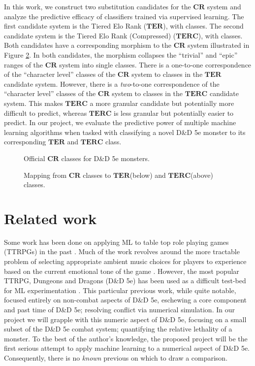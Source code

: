 \documentclass{article}
\newcommand{\Qty}[1]{\oldstylenums{#1}}
\newcommand{\CR}{\ensuremath{\mathbf{CR}}\xspace}
\newcommand{\TER}{\ensuremath{\mathbf{TER}}\xspace}
\newcommand{\TERC}{\ensuremath{\mathbf{TERC}}\xspace}
\newcommand{\DnD}{D\&D 5e\xspace}
\begin{document}
In this work, we construct two substitution candidates for the \CR system and analyze the predictive efficacy of classifiers trained via supervised learning.
The first candidate system is the Tiered Elo Rank (\TER), with \Qty{22} classes.
The second candidate system is the Tiered Elo Rank (Compressed) (\TERC), with \Qty{12} classes.
Both candidates have a corresponding morphism to the \CR system illustrated in Figure \ref{fig:CR-Mapping}.
In both candidates, the morphism collapses the ``trivial'' and ``epic'' ranges of the \CR system into single classes.
There is a one-to-one correspondence of the ``character level'' classes of the \CR system to classes in the \TER candidate system.
However, there is a \emph{two}-to-one correspondence of the ``character level'' classes of the \CR system to classes in the \TERC candidate system.
This makes \TERC a more granular candidate but potentially more difficult to predict, whereas \TERC is less granular but potentially easier to predict.
In our project, we evaluate the predictive power of multiple machine learning algorithms when tasked with classifying a novel \DnD monster to its corresponding \TER and \TERC class.


\begin{figure}[htb]
\centering
\resizebox{\textwidth}{!}{}
\caption{Official \CR classes for \DnD monsters.}\label{fig:CR-Classes}
\end{figure}


\begin{figure}[htb]
\centering
\resizebox{\textwidth}{!}{}
\caption{Mapping from \CR classes to \TER(below) and \TERC (above) classes.}\label{fig:CR-Mapping}
\end{figure}


\section{Related work}
Some work has been done on applying ML to table top role playing games (TTRPGs) in the past \cite{rameshkumar2020storytelling, macinnes2019d, cavanaugh2016machine, faria2019adaptive, riedl2013interactive}.
Much of the work revolves around the more tractable problem of selecting appropriate ambient music choices for players to experience based on the current emotional tone of the game \cite{ferreira2017mtg, risi2020increasing, padovani2017bardo, ferreira2020computer}.
However, the most popular TTRPG, Dungeons and Dragons (\DnD) has been used as a difficult test-bed for ML experimentation \cite{martin2018dungeons}.
This particular previous work, while quite notable, focused entirely on non-combat aspects of \DnD, eschewing a core component and past time of \DnD; resolving conflict via numerical simulation.
In our project we will grapple with this numeric aspect of \DnD, focusing on a small subset of the \DnD combat system; quantifying the relative lethality of a monster.
To the best of the author's knowledge, the proposed project will be the first serious attempt to apply machine learning to a numerical aspect of \DnD.
Consequently, there is no \emph{known} previous on which to draw a comparison.
\end{document}
